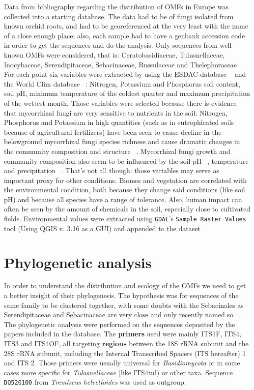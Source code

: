 Data from bibliography regarding the distribution of OMFs in Europe was collected into a starting database. The data had to be of fungi isolated from known orchid roots, and had to be georeferenced at the very least with the name of a close enough place; also, each sample had to have a genbank accession code in order to get the sequences and do the analysis.
Only sequences from well-known OMFs were considered, that is: Ceratobasidiaceae, Tulasnellaceae, Inocybaceae, Serendipitaceae, Sebacinaceae, Russulaceae and Thelephoraceae ~\citep{dearnaley2012}
For each point six variables were extracted by using the ESDAC database ~\citep{esdac} and the World Clim database ~\citep{worldclim}: Nitrogen, Potassium and Phosphorus soil content, soil pH, minimum temperature of the coldest quarter and maximum precipitation of the wettest month. Those variables were selected because there is evidence that mycorrhizal fungi are very sensitive to nutrients in the soil: Nitrogen, Phosphorus and Potassium in high quantities (such as in eutrophicated soils because of agricultural fertilizers) have been seen to cause decline in the belowground mycorrhizal fungi species richness and cause dramatic changes in the community composition and structure ~\citep{lilleskov2002, baar2002, grant2011}. Mycorrhizal fungi growth and community composition also seem to be influenced by the soil pH ~\citep{aarle2002, carrino-kyker2016}, temperature and precipitation ~\citep{rillig2003}. That's not all though: those variables may serve as important proxy for other conditions. Biomes and vegetation are correlated with the environmental condition, both because they change said conditions (like soil pH) and because all species have a range of tolerance. Also, human impact can often be seen by the amount of chemicals in the soil, especially close to cultivated fields.
Environmental values were extracted using \texttt{GDAL}'s \texttt{Sample Raster Values} tool (Using QGIS v. 3.16 as a GUI) and appended to the dataset

\chapter{Phylogenetic analysis}
\label{phylogeneticanalysis}

In order to understand the distribution and ecology of the OMFs we need to get a better insight of their phylogenesis. The hypothesis was for sequences of the same family to be clustered together, with some doubts with the Sebacinales as Serendipitaceae and Sebacinaceae are very close and only recently named so ~\citep{weiss2016a}.
The phylogenetic analysis were performed on the sequences deposited by the papers included in the database.
The \textbf{primers} used were mainly ITS1F, ITS4, ITS3 and ITS4OF, all targeting \textbf{regions} between the 18S rRNA subunit and the 28S rRNA subunit, including the Internal Transcribed Spacers (ITS hereafter) 1 and ITS 2. Those primers were usually universal for \emph{Basidiomycota} or in some cases more specific for \emph{Tulasnellaceae} (like ITS4tul) or other taxa.
Sequence \texttt{DQ520100} from \emph{Tremiscus helvelloides} was used as outgroup.

